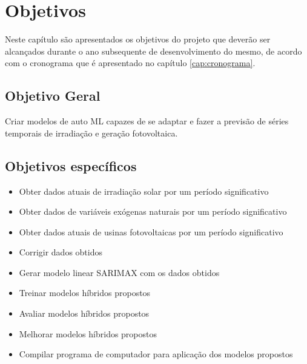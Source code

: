 \chapter{Objetivos}
\label{cap:objetivos}

Neste capítulo são apresentados os objetivos do projeto que deverão ser alcançados durante o ano subsequente de desenvolvimento do mesmo, de acordo com o cronograma que é apresentado no capítulo \ref{cap:cronograma}.

\section{Objetivo Geral}

Criar modelos de auto ML capazes de se adaptar e fazer a previsão de séries temporais de irradiação e geração fotovoltaica.

\section{Objetivos específicos}

\begin{itemize}
    \item Obter dados atuais de irradiação solar por um período significativo
    \item Obter dados de variáveis exógenas naturais por um período significativo
    \item Obter dados atuais de usinas fotovoltaicas por um período significativo
    \item Corrigir dados obtidos
    \item Gerar modelo linear SARIMAX com os dados obtidos
    \item Treinar modelos híbridos propostos
    \item Avaliar modelos híbridos propostos
    \item Melhorar modelos híbridos propostos
    \item Compilar programa de computador para aplicação dos modelos propostos
\end{itemize}